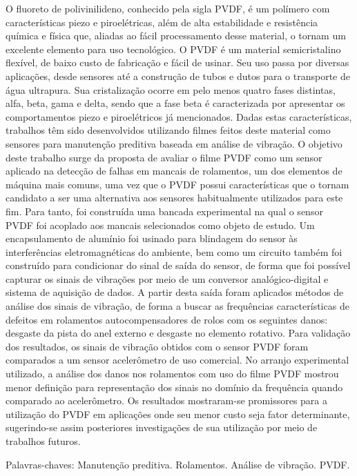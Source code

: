 \documentclass[
	12pt,				
	oneside,			
	a4paper,			
	english,			
	brazil,	
	sumario=abnt-6027-2012		
	]{abntex2ppgsi}
\begin{document}
\begin{resumo}
O fluoreto de polivinilideno, conhecido pela sigla PVDF, é um polímero com características piezo e piroelétricas, além de alta estabilidade e resistência química e física que, aliadas ao fácil processamento desse material, o tornam um excelente elemento para uso tecnológico. O PVDF é um material semicristalino flexível, de baixo custo de fabricação e fácil de usinar. Seu uso passa por diversas aplicações, desde sensores até a construção de tubos e dutos para o transporte de água ultrapura. Sua cristalização ocorre em pelo menos quatro fases distintas, alfa, beta, gama e delta, sendo que a fase beta é caracterizada por apresentar os comportamentos piezo e piroelétricos já mencionados. Dadas estas características, trabalhos têm sido desenvolvidos utilizando filmes feitos deste material como sensores para manutenção preditiva baseada em análise de vibração. O objetivo deste trabalho surge da proposta de avaliar o filme PVDF como um sensor aplicado na detecção de falhas em mancais de rolamentos, um dos elementos de máquina mais comuns, uma vez que o PVDF possui características que o tornam candidato a ser uma alternativa aos sensores habitualmente utilizados para este fim. Para tanto, foi construída uma bancada experimental na qual o sensor PVDF foi acoplado aos mancais selecionados como objeto de estudo. Um encapsulamento de alumínio foi usinado para blindagem do sensor às interferências eletromagnéticas do ambiente, bem como um circuito também foi construído para condicionar do sinal de saída do sensor, de forma que foi possível capturar os sinais de vibrações por meio de um conversor analógico-digital e sistema de aquisição de dados. A partir desta saída foram aplicados métodos de análise dos sinais de vibração, de forma a buscar as frequências características de defeitos em rolamentos autocompensadores de rolos com os seguintes danos: desgaste da pista do anel externo e desgaste no elemento rotativo. Para validação dos resultados, os sinais de vibração obtidos com o sensor PVDF foram comparados a um sensor acelerômetro de uso comercial. No arranjo experimental utilizado, a análise dos danos nos rolamentos com uso do filme PVDF mostrou menor definição para representação dos sinais no domínio da frequência quando comparado ao acelerômetro. Os resultados mostraram-se promissores para a utilização do PVDF em aplicações onde seu menor custo seja fator determinante, sugerindo-se assim posteriores investigações de sua utilização por meio de trabalhos futuros. 

Palavras-chaves: Manutenção preditiva. Rolamentos. Análise de vibração. PVDF.
\end{resumo}
\end{document}
